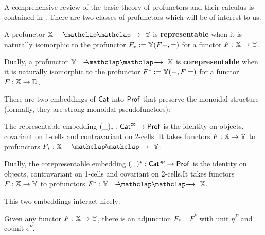 A comprehensive review of the basic theory of profunctors and their calculus is contained in \cite{fosco}.
There are two classes of profunctors which will be of interest to us:

\begin{definition}


A profunctor $\X\proarrow \Y$ is {\bf representable} when it is naturally isomorphic to the profunctor $F_*:=\mathbb{Y}(F-,=)$ for a functor $F: \mathbb{X}\to \mathbb{Y}$.


Dually, a profunctor $\Y\proarrow \X$ is {\bf corepresentable} when it is naturally isomorphic to the profunctor $F^*:=\mathbb{Y}(-,F=)$ for a functor $F: \mathbb{X}\to \mathbb{D}$.


\end{definition}

There are two embeddings of ${\sf Cat}$ into ${\sf Prof}$ that preserve the monoidal structure (formally, they are strong monoidal pseudofunctors):

\begin{definition}
The representable embedding $(\_)_*:{\sf Cat}^{\mathsf{co}} \to {\sf Prof}$ is the identity on objects,  covariant on 1-cells and contravariant on 2-cells.  It takes functors $F:\mathbb{X}\to \mathbb{Y}$ to profunctors  $F_*:\X\proarrow \Y$.


Dually, the corepresentable embedding $(\_)^*:{\sf Cat}^{\mathsf{op}} \to {\sf Prof}$  is the identity on objects, contravariant on 1-cells and covariant on 2-cells.It takes functors $F:\mathbb{X}\to \mathbb{Y}$ to profunctors  $F^*:\Y\proarrow \X$.

\end{definition}

This two embeddings interact nicely:

\begin{lemma}
Given any functor $F:\mathbb{X}\to \mathbb{Y}$, there is an adjunction $F_* \dashv F^*$ with unit $\eta^F$ and counit $\epsilon^F$.
\end{lemma}

